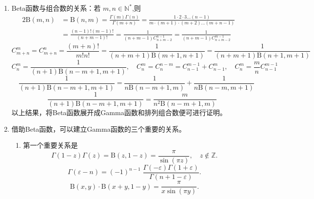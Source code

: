 \begin{property}
\begin{enumerate}[noitemsep]
		\item Beta函数与组合数的关系：若 $ m,n \in \mathbb{N^*}$,则
		\begin{alignat*}{2}
		{\mathrm{B}\left(m,n\right) }&= \mathrm{B}\left(n,m\right) = \frac{\Gamma\left(m\right)\Gamma\left(n\right)}{\Gamma\left(m+n\right)}= \frac{1\cdot2 \cdot 3 \dots \left(n-1\right)}{m\cdot \left(m+1\right) \cdot \left(m+2\right) \dots \left(m+n-1\right)} \\
		& =\frac{\left(n-1\right)!\left(m-1\right)!}{\left(n+m-1\right)!} = \frac{1}{\left(n+m-1\right)C^{n-1}_{n+m-2}} = \frac{1}{\left(n+m-1\right)C^{m-1}_{n+m-2}}
		\end{alignat*}
		$$
		C^m_{m+n} = C^n_{m+n} = \frac{\left(m+n\right)!}{m!n!} = \frac{1}{\left(n+m+1\right)\mathrm{B}(m+1,n+1)} = \frac{1}{\left(n+m+1\right)\mathrm{B}(n+1,m+1)}
		$$
		$$
		C^m_n = \frac{1}{\left(n+1\right)\mathrm{B}(n-m+1,m+1)},\quad C^m_n = C^{n-m}_n = C^{m-1}_{n-1} +  C^{m}_{n-1},\quad C^m_n = \frac{m}{n}C^{m-1}_{n-1}
		$$
		$$
		\quad \frac{1}{\left(n+1\right)\mathrm{B}(n-m+1,m+1)} = \frac{1}{n\mathrm{B}(n-m+1,m)}+\frac{1}{n\mathrm{B}(n-m,m+1)} 
		$$
		$$ \quad \frac{1}{\left(n+1\right)\mathrm{B}(n-m+1,m+1)} = \frac{m}{n^2\mathrm{B}(n-m+1,m)} 
		$$
		以上结果，将Beta函数展开成Gamma函数和排列组合数便可进行证明。
		\item 借助Beta函数，可以建立Gamma函数的三个重要的关系。
		\begin{enumerate}
			\item 第一个重要关系是
			\begin{equation}
			\Gamma \left(1-z\right)\Gamma\left(z\right) = {\mathrm{B}\left(z,1-z\right) } =\frac{\pi}{\sin {\left(\pi z\right)}}, \quad z\not \in \mathbb{Z}.
			\end{equation}
			\begin{equation}
			\Gamma \left(\varepsilon -n\right)=\left(-1\right)^{n-1}\;{\frac {\Gamma \left(-\varepsilon \right)\Gamma \left(1+\varepsilon \right)}{\Gamma \left(n+1-\varepsilon \right)}}.
			\end{equation}
			\begin{equation}
				\mathrm {B} (x,y) \cdot \mathrm {B} (x+y,1-y)={\frac {\pi }{x\sin(\pi y)}}.
			\end{equation}
			

\end{enumerate}
\end{enumerate}
\end{property}
